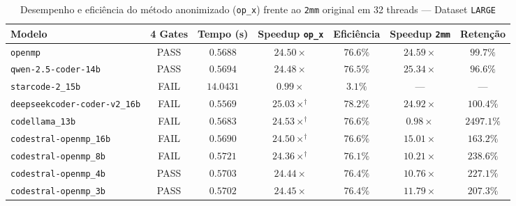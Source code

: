 
\begin{table}[htbp]
\centering
\caption{Desempenho e eficiência do método anonimizado (\texttt{op\_x}) frente ao \texttt{2mm} original em 32 threads — Dataset \texttt{LARGE}}
\label{tab:anon_scale_large_32t}
\small
\begin{tabular}{lcccccc}
\toprule
\textbf{Modelo} & \textbf{4 Gates} & \textbf{Tempo (s)} & \textbf{Speedup \texttt{op\_x}} & \textbf{Eficiência} & \textbf{Speedup \texttt{2mm}} & \textbf{Retenção} \\
\midrule
\texttt{openmp} & PASS & $0.5688$ & $24.50\times$ & $76.6\%$ & $24.59\times$ & $99.7\%$ \\
\texttt{qwen-2.5-coder-14b} & PASS & $0.5694$ & $24.48\times$ & $76.5\%$ & $25.34\times$ & $96.6\%$ \\
\texttt{starcode-2\_15b} & FAIL & $14.0431$ & $0.99\times$ & $3.1\%$ & --- & --- \\
\texttt{deepseekcoder-coder-v2\_16b} & FAIL & $0.5569$ & $25.03\times^\dagger$ & $78.2\%$ & $24.92\times$ & $100.4\%$ \\
\texttt{codellama\_13b} & FAIL & $0.5683$ & $24.53\times^\dagger$ & $76.6\%$ & $0.98\times$ & $2497.1\%$ \\
\texttt{codestral-openmp\_16b} & FAIL & $0.5690$ & $24.50\times^\dagger$ & $76.6\%$ & $15.01\times$ & $163.2\%$ \\
\texttt{codestral-openmp\_8b} & FAIL & $0.5721$ & $24.36\times^\dagger$ & $76.1\%$ & $10.21\times$ & $238.6\%$ \\
\texttt{codestral-openmp\_4b} & PASS & $0.5703$ & $24.44\times$ & $76.4\%$ & $10.76\times$ & $227.1\%$ \\
\texttt{codestral-openmp\_3b} & PASS & $0.5702$ & $24.45\times$ & $76.4\%$ & $11.79\times$ & $207.3\%$ \\
\bottomrule
\end{tabular}
\end{table}

